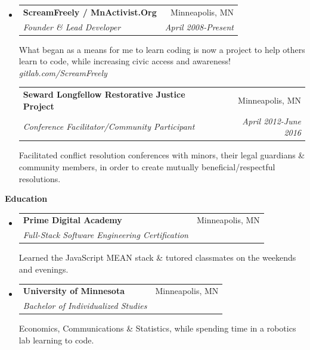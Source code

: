 \documentclass[letterpaper,11pt]{article}
\makeatletter
\newcommand{\resitem}[1]{\item #1 \vspace{-3pt}}
\newcommand{\resheading}[1]{{\Large {\textbf{#1 \vphantom{p\^{E}}}}}}
\newcommand{\ressubheading}[4]{
\begin{tabular*}{6.75in}{l@{\extracolsep{\fill}}r}
		\textbf{#1} & #2 \\
		\textit{#3} & \textit{#4} \\
\end{tabular*}\vspace{-6pt}}
\makeatother
\begin{document}
\begin{itemize}[label={}]

\item
	\ressubheading{ScreamFreely / MnActivist.Org}{Minneapolis, MN}{Founder \& Lead Developer}{April 2008-Present}

\vspace{.25cm}

What began as a means for me to learn coding is now a project to help others learn to code, while increasing civic access and awareness! \textit{gitlab.com/ScreamFreely}	

\vspace{.25cm}

	\ressubheading{Seward Longfellow Restorative Justice Project}{Minneapolis, MN}{Conference Facilitator/Community Participant}{April 2012-June 2016}

\vspace{.25cm}

Facilitated conflict resolution conferences with minors, their legal guardians \& community members, in order to create mutually beneficial/respectful resolutions.

\end{itemize}



\vspace{.25cm}

\resheading{Education}

\vspace{.2cm}

\begin{itemize}[label={}]
\item
	\ressubheading{Prime Digital Academy}{Minneapolis, MN}{Full-Stack Software Engineering Certification}{}

\vspace{.25cm}

	Learned the JavaScript MEAN stack \& tutored classmates on the weekends and evenings.


\item
	\ressubheading{University of Minnesota}{Minneapolis, MN}{Bachelor of Individualized Studies}{}

\vspace{.25cm}

	Economics, Communications \& Statistics, while spending time in a robotics lab learning to code.



\end{itemize}
\end{document}
